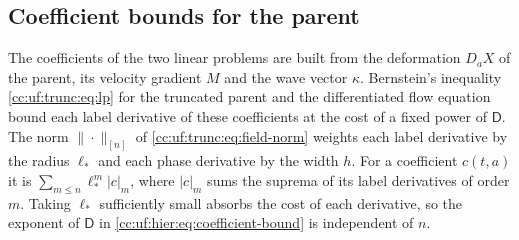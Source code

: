 \subsection{Coefficient bounds for the parent}\label{cc:uf:trunc:sec:parent}
The coefficients of the two linear problems are built from the
deformation $D_aX$ of the parent, its velocity gradient $M$ and the wave
vector $\kappa$. Bernstein's inequality \eqref{cc:uf:trunc:eq:lp} for
the truncated parent and the differentiated flow equation bound each
label derivative of these coefficients at the cost of a fixed power
of $\mathsf D$. The norm $\|\cdot\|_{[n]}$ of
\eqref{cc:uf:trunc:eq:field-norm} weights each label derivative by
the radius $\ell_*$ and each phase derivative by the width $h$.
For a coefficient $c(t,a)$ it is $\sum_{m\le n}\ell_*^m|c|_m$, where
$|c|_m$ sums the suprema of its label derivatives of order $m$.
Taking $\ell_*$ sufficiently small absorbs the cost of each derivative,
so the exponent of $\mathsf D$ in \eqref{cc:uf:hier:eq:coefficient-bound}
is independent of $n$.

